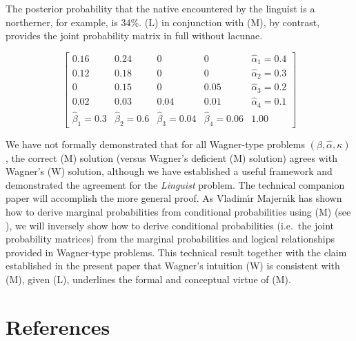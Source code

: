 \documentclass[11pt]{article}
\begin{document}
The posterior probability that the native encountered by the linguist
is a northerner, for example, is 34\%. (L) in conjunction with (M), by
contrast, provides the joint probability matrix in full without
lacunae.

\begin{equation}
  \label{eq:p11}
      \left[
      \begin{array}{ccccc}
        0.16 & 0.24 & 0 & 0 & \hat{\alpha}_{1}=0.4 \\
        0.12 & 0.18 & 0 & 0 & \hat{\alpha}_{2}=0.3 \\
        0 & 0.15 & 0 & 0.05 & \hat{\alpha}_{3}=0.2 \\
        0.02 & 0.03 & 0.04 & 0.01 & \hat{\alpha}_{4}=0.1 \\
        \hat{\beta}_{1}=0.3 & \hat{\beta}_{2}=0.6 & \hat{\beta}_{3}=0.04 & \hat{\beta}_{4}=0.06 & 1.00
      \end{array}
\right]
\end{equation}

We have not formally demonstrated that for all Wagner-type problems
$(\beta,\hat{\alpha},\kappa)$, the correct (M) solution (versus
Wagner's deficient (M) solution) agrees with Wagner's (W) solution,
although we have established a useful framework and demonstrated the
agreement for the \emph{Linguist} problem. The technical companion
paper will accomplish the more general proof. As Vladim{\'\i}r
Majern{\'\i}k has shown how to derive marginal probabilities from
conditional probabilities using (M) (see ), we
will inversely show how to derive conditional probabilities (i.e.\ the
joint probability matrices) from the marginal probabilities and
logical relationships provided in Wagner-type problems. This technical
result together with the claim established in the present paper that
Wagner's intuition (W) is consistent with (M), given (L), underlines
the formal and conceptual virtue of (M).

\section{References}
\label{References}

% 


\end{document}
